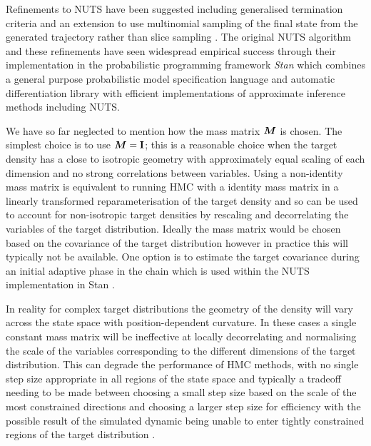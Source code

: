 Refinements to \ac{NUTS} have been suggested including generalised termination criteria \citep{betancourt2016identifying,betancourt2013generalizing} and an extension to use multinomial sampling of the final state from the generated trajectory rather than slice sampling \citep{betancourt2016identifying,betancourt2017conceptual}. The original \ac{NUTS} algorithm and these refinements have seen widespread empirical success through their implementation in the probabilistic programming framework \emph{Stan} \citep{carpenter2016stan} which combines a general purpose probabilistic model specification language \citep{stan2017stan} and automatic differentiation library \citep{carpenter2015stan} with efficient implementations of approximate inference methods including \ac{NUTS}.

We have so far neglected to mention how the mass matrix $\boldsymbol{M}$ is chosen. The simplest choice is to use $\boldsymbol{M} = \mathbf{I}$; this is a reasonable choice when the target density has a close to isotropic geometry with approximately equal scaling of each dimension and no strong correlations between variables. Using a non-identity mass matrix is equivalent to running \ac{HMC} with a identity mass matrix in a linearly transformed reparameterisation of the target density \citep{neal2011mcmc} and so can be used to account for non-isotropic target densities by rescaling and decorrelating the variables of the target distribution. Ideally the mass matrix would be chosen based on the covariance of the target distribution \citep{neal2011mcmc,betancourt2017conceptual} however in practice this will typically not be available. One option is to estimate the target covariance during an initial adaptive phase in the chain which is used within the \ac{NUTS} implementation in Stan \cite{carpenter2016stan}.

In reality for complex target distributions the geometry of the density will vary across the state space with position-dependent curvature. In these cases a single constant mass matrix will be ineffective at locally decorrelating and normalising the scale of the variables corresponding to the different dimensions of the target distribution. This can degrade the performance of \ac{HMC} methods, with no single step size appropriate in all regions of the state space and typically a tradeoff needing to be made between choosing a small step size based on the scale of the most constrained directions and choosing a larger step size for efficiency with the possible result of the simulated dynamic being unable to enter tightly constrained regions of the target distribution \citep{betancourt2013general}. 

